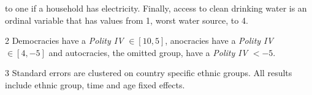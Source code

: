 \begin{table}[!h]
{\begin{threeparttable}
\begin{tablenotes}
{                      to one if a household has electricity. Finally, access to clean drinking water is an 
                      ordinal variable that has values from 1, worst water source, to 4.}
\item[2] Democracies have a \textit{Polity IV } $\in [10, 5]$, anocracies have a \textit{Polity IV } 
                      $\in [4, -5]$ and autocracies, the omitted group, have a \textit{Polity IV } $<-5$.
\item[3] \footnotesize{Standard errors are clustered on country specific ethnic groups. All 
                      results include ethnic group, time and age fixed effects.}
\end{tablenotes}
\end{threeparttable}}
\end{table}
